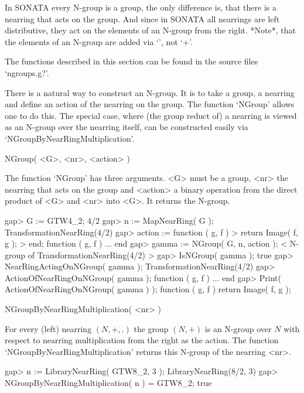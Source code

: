 %
%

In SONATA every N-group is a group, the only difference is, that there
is a nearring that acts on the group. And since in SONATA all
nearrings are left distributive, they act on the elements of an
N-group from the right. *Note*, that the elements of an N-group are
added via `\*', not `+'.

The functions described in this section can be found in the source files
`ngroups.g?'.



There is a natural way to construct an N-group. It is to take a group,
a nearring and define an action of the nearring on the group. The
function `NGroup' allows one to do this. The special case, where
(the group reduct of) a nearring is viewed as an N-group over the
nearring itself, can be constructed easily via
`NGroupByNearRingMultiplication'.

\>NGroup( <G>, <nr>, <action> )

The function `NGroup' has three arguments. <G> must be a group, <nr> the
nearring that acts on the group and <action> a binary operation from the
direct product of <G> and <nr> into <G>. It returns the N-group.

\beginexample
    gap> G := GTW4_2;                
    4/2
    gap> n := MapNearRing( G );
    TransformationNearRing(4/2)
    gap> action := function ( g, f )
    > return Image( f, g );
    > end;  
    function ( g, f ) ... end
    gap> gamma := NGroup( G, n, action );
    < N-group of TransformationNearRing(4/2) >
    gap> IsNGroup( gamma );
    true
    gap> NearRingActingOnNGroup( gamma );
    TransformationNearRing(4/2)
    gap> ActionOfNearRingOnNGroup( gamma );
    function ( g, f ) ... end
    gap> Print( ActionOfNearRingOnNGroup( gamma ) );
    function ( g, f )
        return Image( f, g );
\endexample

\>NGroupByNearRingMultiplication( <nr> )

For every (left) nearring $(N,+,.)$ the group $(N,+)$ is an N-group
over $N$ with respect to nearring multiplication from the right as the
action.  The function `NGroupByNearRingMultiplication' returns this
N-group of the nearring <nr>.

\beginexample
    gap> n := LibraryNearRing( GTW8_2, 3 );
    LibraryNearRing(8/2, 3)
    gap> NGroupByNearRingMultiplication( n ) = GTW8_2;
    true
\endexample


